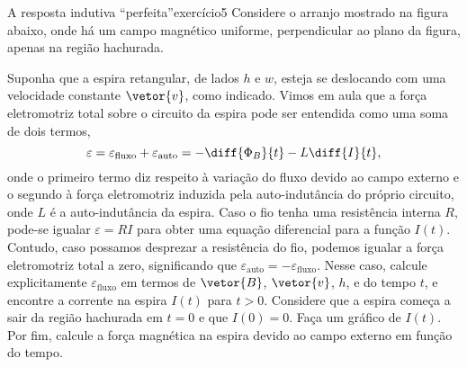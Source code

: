 \begin{exercício}{A resposta indutiva \enquote{perfeita}}{exercício5}
    Considere o arranjo mostrado na figura abaixo, onde há um campo magnético uniforme, perpendicular ao plano da figura, apenas na região hachurada.
    \begin{center}
    \end{center}
    Suponha que a espira retangular, de lados \(h\) e \(w\), esteja se deslocando com uma velocidade constante \(\vetor{v}\), como indicado. Vimos em aula que a força eletromotriz total sobre o circuito da espira pode ser entendida como uma soma de dois termos,
    \begin{equation*}
        \varepsilon = \varepsilon_{\mathrm{fluxo}} + \varepsilon_{\mathrm{auto}} = - \diff{\Phi_{B}}{t} - L\diff{I}{t},
    \end{equation*}
    onde o primeiro termo diz respeito à variação do fluxo devido ao campo externo e o segundo à força eletromotriz induzida pela auto-indutância do próprio circuito, onde \(L\) é a auto-indutância da espira. Caso o fio tenha uma resistência interna \(R\), pode-se igualar \(\varepsilon = RI\) para obter uma equação diferencial para a função \(I(t)\). Contudo, caso possamos desprezar a resistência do fio, podemos igualar a força eletromotriz total a zero, significando que \(\varepsilon_{\mathrm{auto}} = -\varepsilon_{\mathrm{fluxo}}\). Nesse caso, calcule explicitamente \(\varepsilon_{\mathrm{fluxo}}\) em termos de \(\vetor{B}\), \(\vetor{v}\), \(h\), e do tempo \(t\), e encontre a corrente na espira \(I(t)\) para \(t > 0\). Considere que a espira começa a sair da região hachurada em \(t = 0\) e que \(I(0) = 0\). Faça um gráfico de \(I(t)\). Por fim, calcule a força magnética na espira devido ao campo externo em função do tempo.
\end{exercício}
